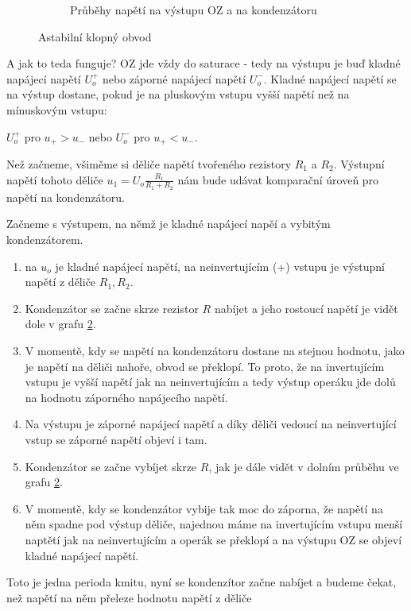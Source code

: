 \documentclass[a4paper,12pt]{article}   %
\begin{document}
\begin{figure}[h!]
\begin{subfigure}{.4\textwidth}
        \caption{Průběhy napětí na výstupu OZ a na kondenzátoru}
        \label{graf:astab:kl}
    \end{subfigure}
    \caption{Astabilní klopný obvod}
\end{figure}



A jak to teda funguje? OZ jde vždy do saturace - tedy na výstupu je buď kladné napájecí napětí $U_o^+$ nebo záporné napájecí napětí $U_o^-$. Kladné napájecí napětí se na výstup dostane, pokud je na pluskovým vstupu vyšší napětí než na mínuskovým vstupu: 

\begin{center}
    $U_o^+$ pro $u_+ > u_-$ nebo $U_o^-$ pro $u_+ < u_-$.
\end{center}

Než začneme, všiměme si děliče napětí tvořeného rezistory $R_1$ a $R_2$. Výstupní napětí tohoto děliče $u_1 = U_o \frac{R_1}{R_1 + R_2}$ nám bude udávat komparační úroveň pro napětí na kondenzátoru.

Začneme s výstupem, na němž je kladné napájecí napěí a vybitým kondenzátorem.

\begin{enumerate}
    \item na $u_o$ je kladné napájecí napětí, na neinvertujícím (+) vstupu je výstupní napětí z děliče $R_1, R_2$.
    \item Kondenzátor se začne skrze rezistor $R$ nabíjet a jeho rostoucí napětí je vidět dole v grafu \ref{graf:astab:kl}.
    \item V momentě, kdy se napětí na kondenzátoru dostane na stejnou hodnotu, jako je napětí na děliči nahoře, obvod se překlopí. To proto, že na invertujícím vstupu je vyšší napětí jak na neinvertujícím a tedy výstup operáku jde dolů na hodnotu záporného napájecího napětí.
    \item Na výstupu je záporné napájecí napětí a díky děliči vedoucí na neinvertující vstup se záporné napětí objeví i tam.
    \item Kondenzátor se začne vybíjet skrze $R$, jak je dále vidět v dolním průběhu ve grafu \ref{graf:astab:kl}.
    \item V momentě, kdy se kondenzátor vybije tak moc do záporna, že napětí na něm spadne pod výstup děliče, najednou máme na invertujícím vstupu menší naptětí jak na neinvertujícím a operák se překlopí a na výstupu OZ se objeví kladné napájecí napětí.
\end{enumerate}
Toto je jedna perioda kmitu, nyní se kondenzítor začne nabíjet a budeme čekat, než napětí na něm přeleze hodnotu napětí z děliče  
\end{document}
